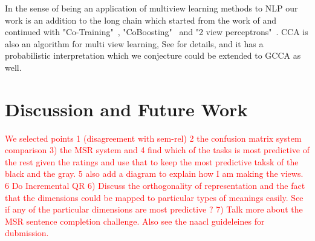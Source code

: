 \documentclass[11pt]{article}
\begin{document}
In the sense of being an application of multiview
learning methods to NLP our work is an addition to the long chain which
started from the work of \cite{yarowsky1995unsupervised} and continued
with "Co-Training"~\cite{blum1998combining}, "CoBoosting"~\cite{collins1999unsupervised} and "2 view
perceptrons"~\cite{brefeld2006efficient}.  CCA is also an algorithm
for multi view learning, See \cite{kakade2007multi,ganchevuai08} for
details, and it has a probabilistic interpretation
\cite{bach2005probabilistic} which we conjecture could be extended to
GCCA as well.

\section{Discussion and Future Work}
\label{sec:futurework}
\textcolor{red}{We selected points 1 (disagreement with sem-rel) 2 the
  confusion matrix system comparison 3) the MSR system and 4  find
  which of the tasks is most predictive of the rest given the ratings
  and use that to keep the most predictive taksk of the black and the
  gray. 5 also add a diagram to explain how I am making the views. 6
  Do Incremental QR 6) Discuss the orthogonality of representation and
the fact that the dimensions could be mapped to particular types of
meanings easily. See if any of the particular dimensions are most
predictive ? 7) Talk more about the MSR sentence completion challenge.
Also see the naacl guideleines for dubmission.}
\end{document}
